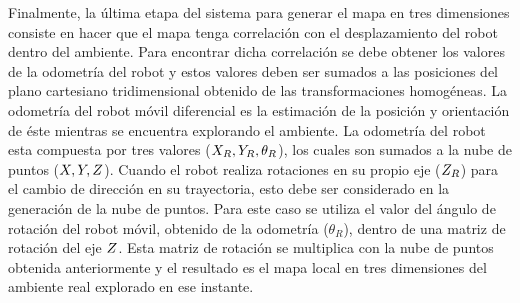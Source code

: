 Finalmente, la última etapa del sistema para generar el mapa en tres dimensiones consiste en 
hacer que el mapa tenga correlación con el desplazamiento del robot dentro del 
ambiente. Para encontrar dicha correlación se debe obtener los valores de la odometría
del robot y estos valores deben ser sumados a las posiciones del plano cartesiano tridimensional 
obtenido de las transformaciones homogéneas. La odometría del robot móvil diferencial 
es la estimación de la posición y orientación de éste mientras se encuentra explorando 
el ambiente. La odometría del robot esta compuesta por tres valores 
($\mathnormal X_{R}, \mathnormal Y_{R}, \theta_{R}$), los cuales son sumados a la nube de puntos
($\mathnormal X, \mathnormal Y, \mathnormal Z$). Cuando el robot realiza rotaciones en su propio eje ($\mathnormal Z_{R}$) 
para el cambio de dirección en su trayectoria, esto debe ser considerado en la generación 
de la nube de puntos. Para este caso se utiliza el valor del ángulo de rotación del
robot móvil, obtenido de la odometría ($\theta_{R}$), dentro de una matriz de rotación del 
eje $\mathnormal Z$. Esta matriz de rotación se multiplica con la nube de puntos obtenida 
anteriormente y el resultado es el mapa local en tres dimensiones del ambiente real 
explorado en ese instante.




